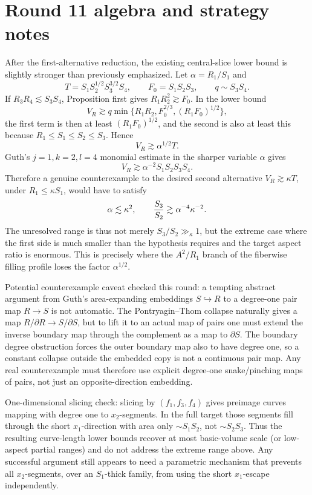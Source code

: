 \documentclass[12pt]{article}
\begin{document}
\section*{Round 11 algebra and strategy notes}

After the first-alternative reduction, the existing central-slice lower bound
is slightly stronger than previously emphasized.  Let
\(\alpha=R_1/S_1\) and
\[
T=S_1S_2^{1/2}S_3^{3/2}S_4,\qquad F_0=S_1S_2S_3,\qquad q\sim S_3S_4 .
\]
If \(R_3R_4\lesssim S_3S_4\), Proposition first gives
\(R_1R_2^2\gtrsim F_0\).  In the lower bound
\[
V_R\gtrsim q\min\{R_1R_2,F_0^{2/3},(R_1F_0)^{1/2}\},
\]
the first term is then at least \((R_1F_0)^{1/2}\), and the second is also at
least this because \(R_1\le S_1\le S_2\le S_3\).  Hence
\[
V_R\gtrsim \alpha^{1/2}T.
\]
Guth's \(j=1,k=2,l=4\) monomial estimate in the sharper variable \(\alpha\) gives
\[
V_R\gtrsim \alpha^{-2}S_1S_2S_3S_4.
\]
Therefore a genuine counterexample to the desired second alternative
\(V_R\gtrsim\kappa T\), under \(R_1\le \kappa S_1\), would have to satisfy
\[
\alpha\lesssim \kappa^2,\qquad {S_3\over S_2}\gtrsim \alpha^{-4}\kappa^{-2}.
\]
The unresolved range is thus not merely \(S_3/S_2\gg_\kappa1\), but the extreme
case where the first side is much smaller than the hypothesis requires and the
target aspect ratio is enormous.  This is precisely where the \(A^2/R_1\) branch
of the fiberwise filling profile loses the factor \(\alpha^{1/2}\).

Potential counterexample caveat checked this round: a tempting abstract
argument from Guth's area-expanding embeddings \(S\hookrightarrow R\) to a
degree-one pair map \(R\to S\) is not automatic.  The Pontryagin--Thom collapse
naturally gives a map \(R/\partial R\to S/\partial S\), but to lift it to an
actual map of pairs one must extend the inverse boundary map through the
complement as a map to \(\partial S\).  The boundary degree obstruction forces
the outer boundary map also to have degree one, so a constant collapse outside
the embedded copy is not a continuous pair map.  Any real counterexample must
therefore use explicit degree-one snake/pinching maps of pairs, not just an
opposite-direction embedding.

One-dimensional slicing check: slicing by \((f_1,f_3,f_4)\) gives preimage curves
mapping with degree one to \(x_2\)-segments.  In the full target those segments
fill through the short \(x_1\)-direction with area only \(\sim S_1S_2\), not
\(\sim S_2S_3\).  Thus the resulting curve-length lower bounds recover at most
basic-volume scale (or low-aspect partial ranges) and do not address the extreme
range above.  Any successful argument still appears to need a parametric
mechanism that prevents all \(x_2\)-segments, over an \(S_1\)-thick family, from
using the short \(x_1\)-escape independently.
\end{document}
